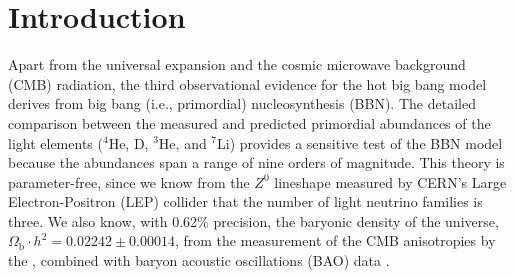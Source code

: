 \documentclass[twocolumn]{aastex63}
\begin{document}



\section{Introduction} 
\label{sec:intro}
Apart from the universal expansion and the cosmic microwave background (CMB) radiation, the third observational evidence for the hot big bang model derives from big bang (i.e., primordial) nucleosynthesis (BBN). The detailed comparison between the measured and predicted primordial abundances of the light elements ($^4$He, D, $^3$He, and $^{7}$Li) provides a sensitive test of the BBN model because the abundances span a range of nine orders of magnitude. This theory is parameter-free, since we know from the $Z^0$ lineshape measured by CERN's Large Electron-Positron (LEP) collider that the number of light neutrino families is three. We also know, with 0.62\% precision, the baryonic density of the universe, $\Omega_{\mathrm{b}}{\cdot}h^2 = 0.02242 \pm 0.00014$, from the measurement of the CMB anisotropies by the \cite{collaboration2018planck}, combined with baryon acoustic oscillations (BAO) data \citep{BAO17}.
\end{document}
